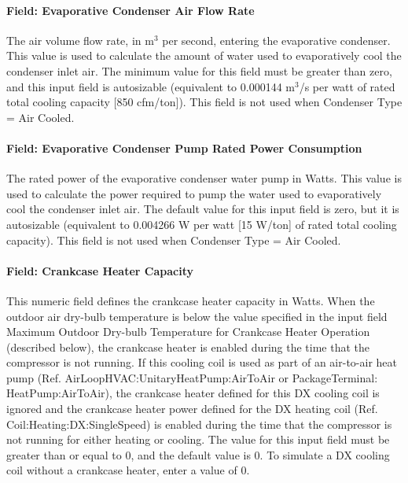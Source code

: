 \paragraph{Field: Evaporative Condenser Air Flow Rate}\label{field-evaporative-condenser-air-flow-rate}

The air volume flow rate, in m\(^{3}\) per second, entering the evaporative condenser. This value is used to calculate the amount of water used to evaporatively cool the condenser inlet air. The minimum value for this field must be greater than zero, and this input field is autosizable (equivalent to 0.000144 m\(^{3}\)/s per watt of rated total cooling capacity {[}850 cfm/ton{]}). This field is not used when Condenser Type = Air Cooled.

\paragraph{Field: Evaporative Condenser Pump Rated Power Consumption}\label{field-evaporative-condenser-pump-rated-power-consumption}

The rated power of the evaporative condenser water pump in Watts. This value is used to calculate the power required to pump the water used to evaporatively cool the condenser inlet air. The default value for this input field is zero, but it is autosizable (equivalent to 0.004266 W per watt {[}15 W/ton{]} of rated total cooling capacity). This field is not used when Condenser Type = Air Cooled.

\paragraph{Field: Crankcase Heater Capacity}\label{field-crankcase-heater-capacity}

This numeric field defines the crankcase heater capacity in Watts. When the outdoor air dry-bulb temperature is below the value specified in the input field Maximum Outdoor Dry-bulb Temperature for Crankcase Heater Operation (described below), the crankcase heater is enabled during the time that the compressor is not running. If this cooling coil is used as part of an air-to-air heat pump (Ref. AirLoopHVAC:UnitaryHeatPump:AirToAir or PackageTerminal: HeatPump:AirToAir), the crankcase heater defined for this DX cooling coil is ignored and the crankcase heater power defined for the DX heating coil (Ref. Coil:Heating:DX:SingleSpeed) is enabled during the time that the compressor is not running for either heating or cooling. The value for this input field must be greater than or equal to 0, and the default value is 0. To simulate a DX cooling coil without a crankcase heater, enter a value of 0.

